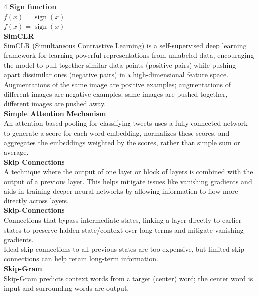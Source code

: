 \documentclass[8pt]{extarticle}
\begin{document}
\begin{multicols}{4}
\vspace{2pt}\textbf{Sign function}\\
$f(x)=\operatorname{sign}(x)$\\
$f(x)=\operatorname{sign}(x)$\\
\vspace{2pt}\textbf{SimCLR}\\
SimCLR (Simultaneous Contrastive Learning) is a self-supervised deep learning framework for learning powerful representations from unlabeled data, encouraging the model to pull together similar data points (positive pairs) while pushing apart dissimilar ones (negative pairs) in a high-dimensional feature space.\\
Augmentations of the same image are positive examples; augmentations of different images are negative examples; same images are pushed together, different images are pushed away.\\
\vspace{2pt}\textbf{Simple Attention Mechanism}\\
An attention-based pooling for classifying tweets uses a fully-connected network to generate a score for each word embedding, normalizes these scores, and aggregates the embeddings weighted by the scores, rather than simple sum or average.\\
\vspace{2pt}\textbf{Skip Connections}\\
A technique where the output of one layer or block of layers is combined with the output of a previous layer. This helps mitigate issues like vanishing gradients and aids in training deeper neural networks by allowing information to flow more directly across layers.\\
\vspace{2pt}\textbf{Skip-Connections}\\
Connections that bypass intermediate states, linking a layer directly to earlier states to preserve hidden state/context over long terms and mitigate vanishing gradients.\\
Ideal skip connections to all previous states are too expensive, but limited skip connections can help retain long-term information.\\
\vspace{2pt}\textbf{Skip-Gram}\\
Skip-Gram predicts context words from a target (center) word; the center word is input and surrounding words are output.\\


\end{multicols}
\end{document}
